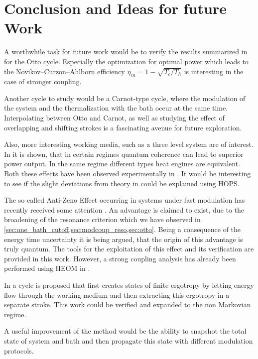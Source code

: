 \chapter{Conclusion and Ideas for future Work}
\label{cha:concl-ideas-future}
A worthwhile task for future work would be to verify the results
summarized in \cite{Binder2018} for the Otto cycle. Especially the
optimization for optimal power which leads to the
Novikov–Curzon–Ahlborn efficiency \(η_{ca}=1-\sqrt{T_{c}/T_{h}}\) is
interesting in the case of stronger coupling.

Another cycle to study would be a Carnot-type cycle, where the
modulation of the system and the thermalization with the bath occur at
the same time. Interpolating between Otto and Carnot, as well as
studying the effect of overlapping and shifting strokes is a
fascinating avenue for future exploration.

Also, more interesting working media, such as a three level system are
of interest. In \cite{Uzdin2015Sep} it is shown, that in certain
regimes quantum coherence can lead to superior power output. In the
same regime different types heat engines are equivalent. Both these
effects have been observed experimentally in \cite{Klatzow2019Mar}. It
would be interesting to see if the slight deviations from theory in
\cite{Klatzow2019Mar} could be explained using HOPS.

The so called Anti-Zeno Effect occurring in systems under fast
modulation has recently received some attention
\cite{Mukherjee2020Jan,Xu2022Mar}. An advantage is claimed to exist,
due to the broadening of the resonance criterion which we have
observed in
\cref{sec:one_bath_cutoff,sec:modcoup_reso,sec:otto}. Being a
consequence of the energy time uncertainty it is being argued, that
the origin of this advantage is truly quantum. The tools for the
exploitation of this effect and its verification are provided in this
work. However, a strong coupling analysis has already been performed
using HEOM in \cite{Xu2022Mar}.

In \cite{Santos2021Jun} a cycle is proposed that first creates states
of finite ergotropy by letting energy flow through the working medium
and then extracting this ergotropy in a separate stroke. This work
could be verified and expanded to the non Markovian regime.

A useful improvement of the method would be the ability to snapshot
the total state of system and bath and then propagate this state with
different modulation protocols.
